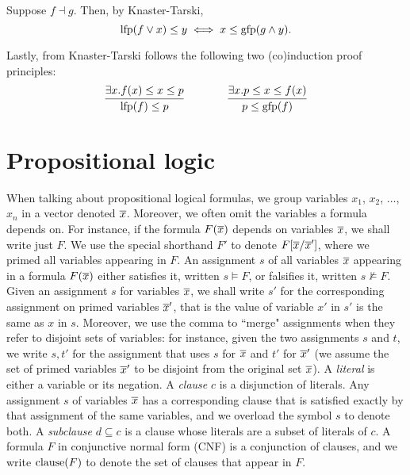 Suppose $f \dashv g$. Then, by Knaster-Tarski,
\begin{equation}
	\text{lfp}(f \lor x) \le y \iff x \le \text{gfp}(g \land y) \label{eq:bg:adjoint-fixpoint} \text{.}
\end{equation}

Lastly, from Knaster-Tarski follows the following two (co)induction proof principles:
\begin{equation}
	\infer{\lfp(f) \le p}{\exists x . f(x) \le x \le p}
	\qquad\qquad
	\infer{p \le \gfp(f)}{\exists x . p \le x \le f(x)}
	\label{eq:bg:coinductionproofprinciple}
\end{equation}

\section{Propositional logic}
When talking about propositional logical formulas, we group variables $x_1$, $x_2$, $\dots$, $x_n$ in a vector denoted $\overline{x}$. Moreover, we often omit the variables a formula depends on. For instance, if the formula $F(\overline{x})$ depends on variables $\overline{x}$, we shall write just $F$. We use the special shorthand $F'$ to denote $F[\overline{x}/\overline{x}']$, where we primed all variables appearing in $F$.
An assignment $s$ of all variables $\overline{x}$ appearing in a formula $F(\overline{x})$ either satisfies it, written $s \vDash F$, or falsifies it, written $s \nvDash F$. Given an assignment $s$ for variables $\overline{x}$, we shall write $s'$ for the corresponding assignment on primed variables $\overline{x}'$, that is the value of variable $x'$ in $s'$ is the same as $x$ in $s$. Moreover, we use the comma to ``merge" assignments when they refer to disjoint sets of variables: for instance, given the two assignments $s$ and $t$, we write $s, t'$ for the assignment that uses $s$ for $\overline{x}$ and $t'$ for $\overline{x}'$ (we assume the set of primed variables $\overline{x}'$ to be disjoint from the original set $\overline{x}$).
A \emph{literal} is either a variable or its negation. A \emph{clause} $c$ is a disjunction of literals. Any assignment $s$ of variables $\overline{x}$ has a corresponding clause that is satisfied exactly by that assignment of the same variables, and we overload the symbol $s$ to denote both. A \emph{subclause} $d \subseteq c$ is a clause whose literals are a subset of literals of $c$. A formula $F$ in conjunctive normal form (CNF) is a conjunction of clauses, and we write $\text{clause}(F)$ to denote the set of clauses that appear in $F$.

